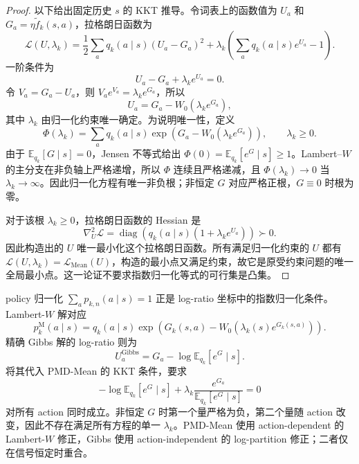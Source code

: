 \begin{proof}
以下给出固定历史 $s$ 的 KKT 推导。令词表上的函数值为 $U_a$ 和 $G_a=\eta\widetilde f_k(s,a)$，拉格朗日函数为
\begin{equation*}
\mathscr L(U,\lambda_k)
=\frac12\sum_a q_k(a\mid s)(U_a-G_a)^2
+\lambda_k\left(\sum_a q_k(a\mid s)e^{U_a}-1\right).
\end{equation*}
一阶条件为
\begin{equation*}
U_a-G_a+\lambda_k e^{U_a}=0.
\end{equation*}
令 $V_a=G_a-U_a$，则 $V_a e^{V_a}=\lambda_k e^{G_a}$，所以
\begin{equation}
\label{eq:ch2-mean-lambert}
U_a=G_a-W_0\!\left(\lambda_k e^{G_a}\right),
\end{equation}
其中 $\lambda_k$ 由归一化约束唯一确定。为说明唯一性，定义
\begin{equation*}
\Phi(\lambda_k)=\sum_a q_k(a\mid s)\exp\!\left(G_a-W_0(\lambda_k e^{G_a})\right),\qquad \lambda_k\geq0.
\end{equation*}
由于 $\mathbb E_{ q_k}[G\mid s]=0$，Jensen 不等式给出
$\Phi(0)=\mathbb E_{ q_k}[e^G\mid s]\ge1$。Lambert--$W$ 的主分支在非负轴上严格递增，所以 $\Phi$ 连续且严格递减，且 $\Phi(\lambda_k)\to0$ 当 $\lambda_k\to\infty$。因此归一化方程有唯一非负根；非恒定 $G$ 对应严格正根，$G\equiv0$ 时根为零。

对于该根 $\lambda_k\ge0$，拉格朗日函数的 Hessian 是
\begin{equation*}
\nabla_U^2\mathscr L
=\operatorname{diag}\!\left( q_k(a\mid s)(1+\lambda_k e^{U_a})\right)\succ0.
\end{equation*}
因此构造出的 $U$ 唯一最小化这个拉格朗日函数。所有满足归一化约束的 $U$ 都有 $\mathscr L(U,\lambda_k)=\mathcal L_{\mathrm{Mean}}(U)$，构造的最小点又满足约束，故它是原受约束问题的唯一全局最小点。这一论证不要求指数归一化等式的可行集是凸集。
\end{proof}

policy 归一化 $\sum_a p_{k,n}(a\mid s)=1$ 正是 log-ratio 坐标中的指数归一化条件。Lambert-$W$ 解对应
\begin{equation*}
 p_k^{\mathrm M}(a\mid s)
= q_k(a\mid s)\exp\!\left(G_k(s,a)-W_0(\lambda_k(s)e^{G_k(s,a)})\right).
\end{equation*}
精确 Gibbs 解的 log-ratio 则为
\begin{equation*}
U_a^{\mathrm{Gibbs}}=G_a-\log\mathbb E_{ q_k}[e^G\mid s].
\end{equation*}
将其代入 PMD-Mean 的 KKT 条件，要求
\begin{equation*}
-\log\mathbb E_{ q_k}[e^G\mid s]
+\lambda_k\frac{e^{G_a}}{\mathbb E_{ q_k}[e^G\mid s]}=0
\end{equation*}
对所有 action 同时成立。非恒定 $G$ 时第一个量严格为负，第二个量随 action 改变，因此不存在满足所有方程的单一 $\lambda_k$。PMD-Mean 使用 action-dependent 的 Lambert-$W$ 修正，Gibbs 使用 action-independent 的 log-partition 修正；二者仅在信号恒定时重合。


